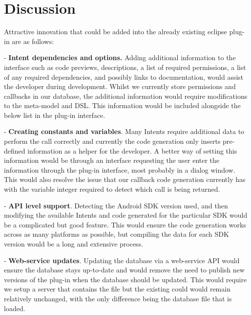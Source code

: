 \section{Discussion}
\label{Discussion}

Attractive innovation that could be added into the already existing eclipse plug-in are as follows:

- \textbf{Intent dependencies and options.} Adding additional information to the interface such as code previews, descriptions, a list of required permissions, a list of any required dependencies, and possibly links to documentation, would assist the developer during development. Whilst we currently store permissions and callbacks in our database, the additional information would require modifications to the meta-model and DSL. This information would be included alongside the below list in the plug-in interface.

- \textbf{Creating constants and variables}. Many Intents require additional data to perform the call correctly and currently the code generation only inserts pre-defined information as a helper for the developer. A better way of setting this information would be through an interface requesting the user enter the information through the plug-in interface, most probably in a dialog window. This would also resolve the issue that our callback code generation currently has with the variable integer required to detect which call is being returned.

- \textbf{API level support}. Detecting the Android SDK version used, and then modifying the available Intents and code generated for the particular SDK would be a complicated but good feature. This would ensure the code generation works across as many platforms as possible, but compiling the data for each SDK version would be a long and extensive process.

- \textbf{Web-service updates}. Updating the database via a web-service API would ensure the database stays up-to-date and would remove the need to publish new versions of the plug-in when the database should be updated. This would require we setup a server that contains the file but the existing could would remain relatively unchanged, with the only difference being the database file that is loaded.
	